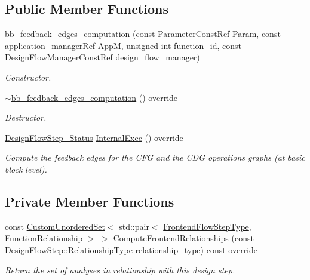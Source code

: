 \subsection*{Public Member Functions}
\begin{DoxyCompactItemize}
\item 
\hyperlink{classbb__feedback__edges__computation_a0a273a7279b7bb423fa8c9620c207a52}{bb\+\_\+feedback\+\_\+edges\+\_\+computation} (const \hyperlink{Parameter_8hpp_a37841774a6fcb479b597fdf8955eb4ea}{Parameter\+Const\+Ref} Param, const \hyperlink{application__manager_8hpp_a04ccad4e5ee401e8934306672082c180}{application\+\_\+manager\+Ref} \hyperlink{classFrontendFlowStep_a0ac0d8db2a378416583f51c4faa59d15}{AppM}, unsigned int \hyperlink{classFunctionFrontendFlowStep_a58ef2383ad1a212a8d3f396625a4b616}{function\+\_\+id}, const Design\+Flow\+Manager\+Const\+Ref \hyperlink{classDesignFlowStep_ab770677ddf087613add30024e16a5554}{design\+\_\+flow\+\_\+manager})
\begin{DoxyCompactList}\small\item\em Constructor. \end{DoxyCompactList}\item 
\hyperlink{classbb__feedback__edges__computation_a10e831308d94bd853e9ee715bd728dca}{$\sim$bb\+\_\+feedback\+\_\+edges\+\_\+computation} () override
\begin{DoxyCompactList}\small\item\em Destructor. \end{DoxyCompactList}\item 
\hyperlink{design__flow__step_8hpp_afb1f0d73069c26076b8d31dbc8ebecdf}{Design\+Flow\+Step\+\_\+\+Status} \hyperlink{classbb__feedback__edges__computation_ab4010208bcd24cdf7c8ff640dc2c2694}{Internal\+Exec} () override
\begin{DoxyCompactList}\small\item\em Compute the feedback edges for the C\+FG and the C\+DG operations graphs (at basic block level). \end{DoxyCompactList}\end{DoxyCompactItemize}
\subsection*{Private Member Functions}
\begin{DoxyCompactItemize}
\item 
const \hyperlink{classCustomUnorderedSet}{Custom\+Unordered\+Set}$<$ std\+::pair$<$ \hyperlink{frontend__flow__step_8hpp_afeb3716c693d2b2e4ed3e6d04c3b63bb}{Frontend\+Flow\+Step\+Type}, \hyperlink{classFrontendFlowStep_af7cf30f2023e5b99e637dc2058289ab0}{Function\+Relationship} $>$ $>$ \hyperlink{classbb__feedback__edges__computation_a9ea7749360a9e109bc92714c4861d135}{Compute\+Frontend\+Relationships} (const \hyperlink{classDesignFlowStep_a723a3baf19ff2ceb77bc13e099d0b1b7}{Design\+Flow\+Step\+::\+Relationship\+Type} relationship\+\_\+type) const override
\begin{DoxyCompactList}\small\item\em Return the set of analyses in relationship with this design step. \end{DoxyCompactList}\end{DoxyCompactItemize}
